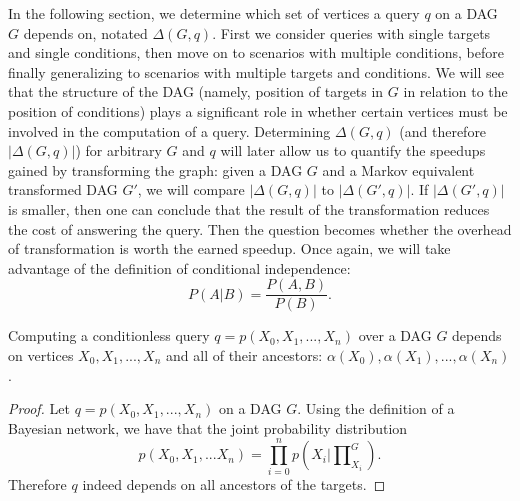 \null \quad \quad In the following section, we determine which set of vertices a query $q$ on a DAG $G$ depends on, notated $\Delta(G,q)$. First we consider queries with single targets and single conditions, then move on to scenarios with multiple conditions, before finally generalizing to scenarios with multiple targets and conditions. We will see that the structure of the DAG (namely, position of targets in $G$ in relation to the position of conditions) plays a significant role in whether certain vertices must be involved in the computation of a query. \newline
\null \quad \quad Determining $\Delta(G,q)$ (and therefore $|\Delta(G,q)|$) for arbitrary $G$ and $q$ will later allow us to quantify the speedups gained by transforming the graph:  given a DAG $G$ and a Markov equivalent transformed DAG $G'$, we will compare $|\Delta(G,q)|$ to $|\Delta(G',q)|$. If $|\Delta(G',q)|$ is smaller, then one can conclude that the result of the transformation reduces the cost of answering the query. Then the question becomes whether the overhead of transformation is worth the earned speedup. \newline 
\null \quad \quad Once again, we will take advantage of the definition of conditional independence: $$P(A|B) = \frac{P(A,B)}{P(B)}.$$ 

\begin{lemma}
Computing a conditionless query $q = p(X_{0}, X_{1}, ..., X_{n})$ over a DAG $G$ depends on vertices $X_{0}, X_{1}, ..., X_{n}$ and all of their ancestors: $\alpha(X_{0}), \alpha(X_{1}), ..., \alpha(X_{n})$. 
\end{lemma}

\begin{proof}
Let $q = p(X_{0}, X_{1}, ..., X_{n})$ on a DAG $G$. Using the definition of a Bayesian network, we have that the joint probability distribution 
$$p(X_{0}, X_{1}, ... X_{n}) = \prod_{i=0}^{n} p(X_{i}|\prod\nolimits_{X_{i}}^{G}).$$ 
Therefore $q$ indeed depends on all ancestors of the targets. 
\end{proof}


